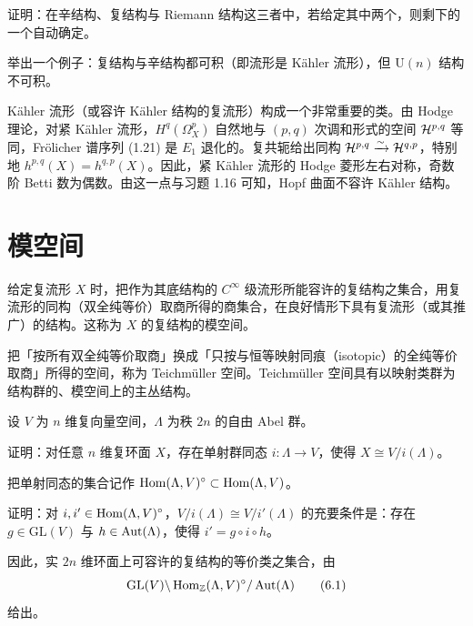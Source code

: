 \begin{exercise}
证明：在辛结构、复结构与 Riemann 结构这三者中，若给定其中两个，则剩下的一个自动确定。
\end{exercise}

\begin{exercise}
举出一个例子：复结构与辛结构都可积（即流形是 Kähler 流形），但 $\mathrm{U}(n)$ 结构不可积。
\end{exercise}

Kähler 流形（或容许 Kähler 结构的复流形）构成一个非常重要的类。由 Hodge 理论，对紧 Kähler 流形，$H^q(\Omega^p_X)$ 自然地与 $(p,q)$ 次调和形式的空间 $\mathcal{H}^{p,q}$ 等同，Frölicher 谱序列 (1.21) 是 $E_1$ 退化的。复共轭给出同构 $\mathcal{H}^{p,q}\xrightarrow{\sim}\mathcal{H}^{q,p}$，特别地 $h^{p,q}(X)=h^{q,p}(X)$。因此，紧 Kähler 流形的 Hodge 菱形左右对称，奇数阶 Betti 数为偶数。由这一点与习题 1.16 可知，Hopf 曲面不容许 Kähler 结构。

\section{模空间}

给定复流形 $X$ 时，把作为其底结构的 $C^\infty$ 级流形所能容许的复结构之集合，用复流形的同构（双全纯等价）取商所得的商集合，在良好情形下具有复流形（或其推广）的结构。这称为 $X$ 的复结构的模空间。

\begin{remark}
把「按所有双全纯等价取商」换成「只按与恒等映射同痕（isotopic）的全纯等价取商」所得的空间，称为 Teichmüller 空间。Teichmüller 空间具有以映射类群为结构群的、模空间上的主丛结构。
\end{remark}

设 $V$ 为 $n$ 维复向量空间，$\Lambda$ 为秩 $2n$ 的自由 Abel 群。

\begin{exercise}
证明：对任意 $n$ 维复环面 $X$，存在单射群同态 $i\colon\Lambda\to V$，使得 $X\cong V/i(\Lambda)$。
\end{exercise}

把单射同态的集合记作 $\operatorname{Hom}(\Lambda,V)^\circ\subset\operatorname{Hom}(\Lambda,V)$。

\begin{exercise}
证明：对 $i,i'\in\operatorname{Hom}(\Lambda,V)^\circ$，$V/i(\Lambda)\cong V/i'(\Lambda)$ 的充要条件是：存在 $g\in\mathrm{GL}(V)$ 与 $h\in\operatorname{Aut}(\Lambda)$，使得 $i'=g\circ i\circ h$。
\end{exercise}

因此，实 $2n$ 维环面上可容许的复结构的等价类之集合，由
\begin{equation}
    \mathrm{GL}(V)\backslash\operatorname{Hom}_{\mathbb{Z}}(\Lambda,V)^\circ/\operatorname{Aut}(\Lambda) \tag{6.1}
\end{equation}
给出。

